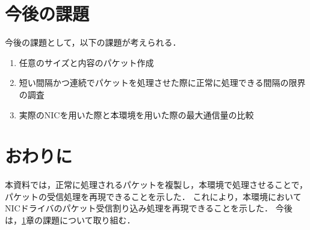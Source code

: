 \documentclass[12pt]{jsarticle}
\begin{document}
\section{今後の課題}\label{kadai}
今後の課題として，以下の課題が考えられる．
\begin{enumerate}
    \item 任意のサイズと内容のパケット作成
    \item 短い間隔かつ連続でパケットを処理させた際に正常に処理できる間隔の限界の調査
    \item 実際のNICを用いた際と本環境を用いた際の最大通信量の比較
\end{enumerate}

\section{おわりに}
本資料では，正常に処理されるパケットを複製し，本環境で処理させることで，
パケットの受信処理を再現できることを示した．
これにより，本環境においてNICドライバのパケット受信割り込み処理を再現できることを示した．
今後は，\ref{kadai}章の課題について取り組む．
\end{document}
